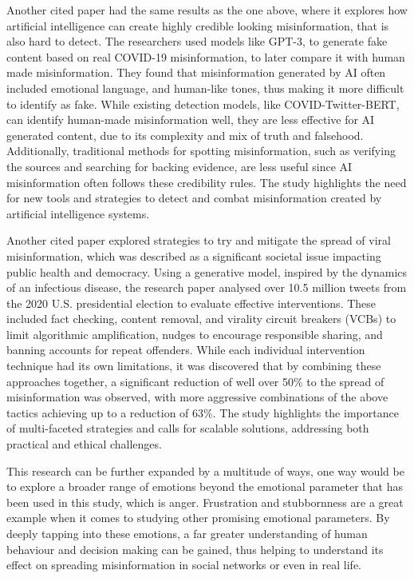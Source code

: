 \documentclass[twocolumn, a4paper, 12pt]{article}
\begin{document}
Another cited paper had the same results as the one above, where it explores how artificial intelligence can create highly credible looking misinformation, that is also hard to detect. The researchers used models like GPT-3, to generate fake content based on real COVID-19 misinformation, to later compare it with human made misinformation. They found that misinformation generated by AI often included emotional language, and human-like tones, thus making it more difficult to identify as fake. While existing detection models, like COVID-Twitter-BERT, can identify human-made misinformation well, they are less effective for AI generated content, due to its complexity and mix of truth and falsehood. Additionally, traditional methods for spotting misinformation, such as verifying the sources and searching for backing evidence, are less useful since AI misinformation often follows these credibility rules. The study highlights the need for new tools and strategies to detect and combat misinformation created by artificial intelligence systems. \cite{ai_increasing_misinformation_2}

Another cited paper explored strategies to try and mitigate the spread of viral misinformation, which was described as a significant societal issue impacting public health and democracy. Using a generative model, inspired by the dynamics of an infectious disease, the research paper analysed over 10.5 million tweets from the 2020 U.S. presidential election to evaluate effective interventions. These included fact checking, content removal, and virality circuit breakers (VCBs) to limit algorithmic amplification, nudges to encourage responsible sharing, and banning accounts for repeat offenders. While each individual intervention technique had its own limitations, it was discovered that by combining these approaches together, a significant reduction of well over 50\% to the spread of misinformation was observed, with more aggressive combinations of the above tactics achieving up to a reduction of 63\%. The study highlights the importance of multi-faceted strategies and calls for scalable solutions, addressing both practical and ethical challenges. \cite{reduce_misinformation}

This research can be further expanded by a multitude of ways, one way would be to explore a broader range of emotions beyond the emotional parameter that has been used in this study, which is anger. Frustration and stubbornness are a great example when it comes to studying other promising emotional parameters. By deeply tapping into these emotions, a far greater understanding of human behaviour and decision making can be gained, thus helping to understand its effect on spreading misinformation in social networks or even in real life.
\end{document}
